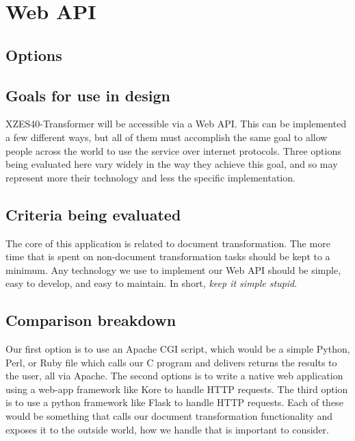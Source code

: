 \section{Web API}

\subsection{Options}

\subsection{Goals for use in design}

XZES40-Transformer will be accessible via a Web API.
This can be implemented a few different ways, but all of them must accomplish the same goal to allow people across the world to use the service over internet protocols.
Three options being evaluated here vary widely in the way they achieve this goal, and so may represent more their technology and less the specific implementation.

\subsection{Criteria being evaluated}

The core of this application is related to document transformation.
The more time that is spent on non-document transformation tasks should be kept to a minimum.
Any technology we use to implement our Web API should be simple, easy to develop, and easy to maintain.
In short, \textit{keep it simple stupid}.

\subsection{Comparison breakdown}

Our first option is to use an Apache CGI script, which would be a simple Python, Perl, or Ruby file which calls our C program and delivers returns the results to the user, all via Apache.
The second options is to write a native web application using a web-app framework like Kore to handle HTTP requests.
The third option is to use a python framework like Flask to handle HTTP requests.
Each of these would be something that calls our document transformation functionality and exposes it to the outside world, how we handle that is important to consider.

